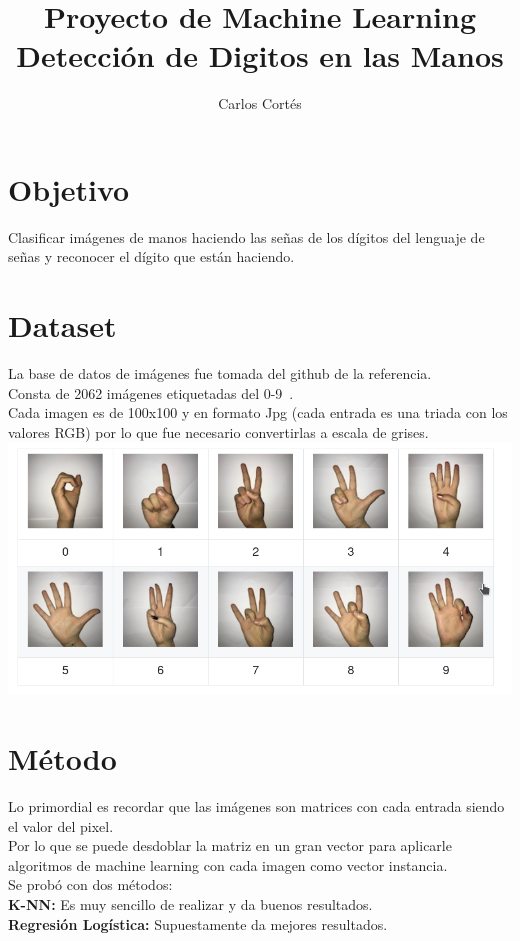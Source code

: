 \documentclass{article}
\title{ Proyecto de Machine Learning\\ \textbf{ Detección de Digitos en las Manos}}
\author{Carlos Cortés}
\begin{document}
  \maketitle
 
    \section{Objetivo}
      Clasificar imágenes de manos haciendo las señas de los dígitos del lenguaje de señas y reconocer el dígito que están haciendo.
      
    \section{Dataset}
        La base de datos de imágenes fue tomada del github de la referencia.\\
        Consta de 2062 imágenes etiquetadas del 0-9~\cite{git}.\\
        Cada imagen es de 100x100 y en formato Jpg (cada entrada es una triada con los valores RGB) por lo que fue necesario convertirlas a escala de grises.\vspace{3mm} \\
        \includegraphics[scale=0.46]{dataset_preview}
    \section{Método}
    
    Lo primordial es recordar que las imágenes son matrices con cada entrada siendo el valor del pixel.\\
    Por lo que se puede desdoblar la matriz en un gran vector para aplicarle algoritmos de machine learning con cada imagen como vector instancia.\\
    Se probó con dos métodos:\\
    \textbf{K-NN: } Es muy sencillo de realizar y da buenos resultados.\\
    \textbf{Regresión Logística: } Supuestamente da mejores resultados.
\end{document}
